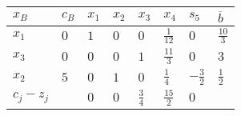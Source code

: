 \documentclass[PM.tex]{subfiles}
\begin{document}
\begin{example}
\begin{tabular}{|l|l|l|l|l|l|l|l|}
\hline
	$x_B$ & $c_B$ & $x_1$ & $x_2$ & $x_3$ & $x_4$ & $s_5$ & $\overline{b}$\\
\hline
	$x_1$ & $0$ & $1$ & $0$ & $0$ & $\frac{1}{12}$ & $0$ & $\frac{10}{3}$\\
	$x_3$ & $0$ & $0$ & $0$ & $1$ & $\frac{11}{3}$ & $0$ & $3$\\
	$x_2$ & $5$ & $0$ & $1$ & $0$ & $\frac{1}{4}$ & $-\frac{3}{2}$ & $\frac{1}{2}$\\
\hline
	$c_j-z_j$ & & $0$ & $0$ & $\frac{3}{4}$ & $\frac{15}{2}$ & $0$ & \\
\hline
\end{tabular}
\end{example}
\end{document}
